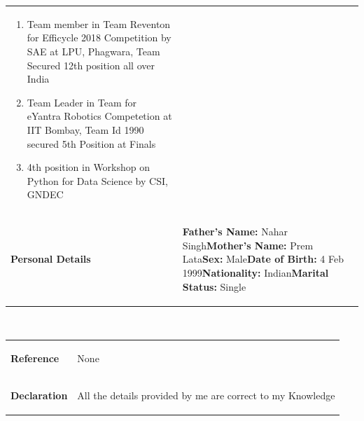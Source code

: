 \documentclass[10pt,doublespace]{article}
\begin{document}
\begin{tabular}{p{3cm}  p{10cm} }
\begin{enumerate}
\item Team member in Team Reventon for Efficycle 2018 Competition by SAE at LPU, Phagwara, Team Secured 12th position all over India 
\item Team Leader in Team for eYantra Robotics Competetion at IIT Bombay, Team Id 1990 secured 5th Position at Finals
\item 4th position in Workshop on Python for Data Science by CSI, GNDEC
\end{enumerate}\\
\begin{flushleft} \textbf{Personal Details}\end{flushleft}&
\begin{flushleft} \textbf{Father’s Name:} Nahar Singh\newline \textbf{Mother’s Name:} Prem Lata\newline \textbf{Sex:} Male\newline \textbf{Date of Birth:} 4 Feb 1999\newline \textbf{Nationality:} Indian\newline \textbf{Marital Status:} Single
\end{flushleft}\\
\end{tabular}\\
\begin{tabular}{p{3cm}  p{10cm} }
\begin{flushleft} \textbf{Reference}\end{flushleft}&
\begin{flushleft} None
\end{flushleft}\\
\begin{flushleft} \textbf{Declaration}\end{flushleft}&
\begin{flushleft} All the details provided by me are correct to my Knowledge
\end{flushleft}\\
 \end{tabular}
\end{document}
